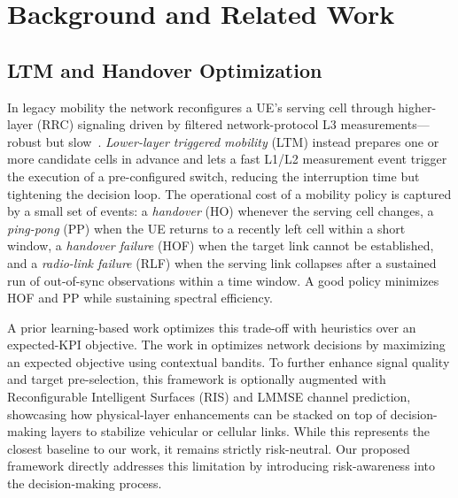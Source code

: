 \documentclass{ieeetmlcn}
\begin{document}
\section{Background and Related Work}
\label{sec:related}

\subsection{LTM and Handover Optimization}
In legacy mobility the network reconfigures a UE's serving cell through
higher-layer (RRC) signaling driven by filtered network-protocol L3 measurements---robust but slow~\cite{eric2024}.
\emph{Lower-layer triggered mobility} (LTM) instead prepares one or more candidate cells in advance and lets a fast L1/L2 measurement event trigger the execution of a pre-configured switch, reducing the interruption time but tightening the decision loop.
The operational cost of a mobility policy is captured by a small set of events: a \emph{handover} (HO) whenever the serving cell changes, a \emph{ping-pong} (PP) when the UE returns to a recently left cell within a short window, a \emph{handover failure} (HOF) when the target
link cannot be established, and a \emph{radio-link failure} (RLF) when the serving link collapses after a sustained run of out-of-sync observations within a time window.
A good policy minimizes HOF and PP while sustaining spectral efficiency.

A prior learning-based work optimizes this trade-off with heuristics over an expected-KPI objective. The work in \cite{cmab_ho} optimizes network decisions by maximizing an expected objective using contextual bandits. To further enhance signal quality and target pre-selection, this framework is optionally augmented with Reconfigurable Intelligent Surfaces (RIS) and LMMSE channel prediction, showcasing how physical-layer enhancements can be stacked on top of decision-making layers to stabilize vehicular or cellular links. While this represents the closest baseline to our work, it remains strictly risk-neutral. Our proposed framework directly addresses this limitation by introducing risk-awareness into the decision-making process.
\end{document}

